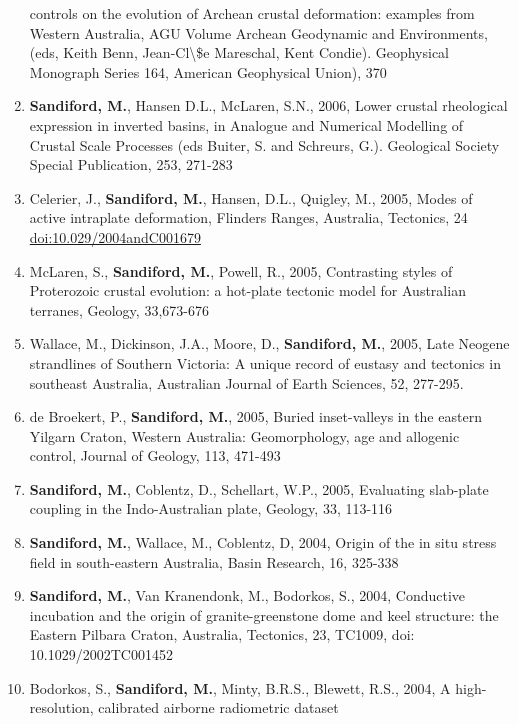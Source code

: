 \documentclass[
]{article}
\begin{document}
\begin{enumerate}
  controls on the evolution of Archean crustal deformation: examples
  from Western Australia, AGU Volume Archean Geodynamic and
  Environments, (eds, Keith Benn, Jean-Cl\textbackslash\$e Mareschal,
  Kent Condie). Geophysical Monograph Series 164, American Geophysical
  Union), 370 
\item
  \textbf{Sandiford, M.}, Hansen D.L., McLaren, S.N., 2006, Lower
  crustal rheological expression in inverted basins, in Analogue and
  Numerical Modelling of Crustal Scale Processes (eds Buiter, S. and
  Schreurs, G.). Geological Society Special Publication, 253, 271-283
\item
  Celerier, J., \textbf{Sandiford, M.}, Hansen, D.L., Quigley, M., 2005,
  Modes of active intraplate deformation, Flinders Ranges, Australia,
  Tectonics, 24 \url{doi:10.029/2004andC001679}
\item
  McLaren, S., \textbf{Sandiford, M.}, Powell, R., 2005, Contrasting
  styles of Proterozoic crustal evolution: a hot-plate tectonic model
  for Australian terranes, Geology, 33,673-676
\item
  Wallace, M., Dickinson, J.A., Moore, D., \textbf{Sandiford, M.}, 2005,
  Late Neogene strandlines of Southern Victoria: A unique record of
  eustasy and tectonics in southeast Australia, Australian Journal of
  Earth Sciences, 52, 277-295. 
\item
  de Broekert, P., \textbf{Sandiford, M.}, 2005, Buried inset-valleys in
  the eastern Yilgarn Craton, Western Australia: Geomorphology, age and
  allogenic control, Journal of Geology, 113, 471-493
\item
  \textbf{Sandiford, M.}, Coblentz, D., Schellart, W.P., 2005,
  Evaluating slab-plate coupling in the Indo-Australian plate, Geology,
  33, 113-116 
\item
  \textbf{Sandiford, M.}, Wallace, M., Coblentz, D, 2004, Origin of the
  in situ stress field in south-eastern Australia, Basin Research, 16,
  325-338
\item
  \textbf{Sandiford, M.}, Van Kranendonk, M., Bodorkos, S., 2004,
  Conductive incubation and the origin of granite-greenstone dome and
  keel structure: the Eastern Pilbara Craton, Australia, Tectonics, 23,
  TC1009, doi: 10.1029/2002TC001452 
\item
  Bodorkos, S., \textbf{Sandiford, M.}, Minty, B.R.S., Blewett, R.S.,
  2004, A high-resolution, calibrated airborne radiometric dataset

\end{enumerate}
\end{document}
